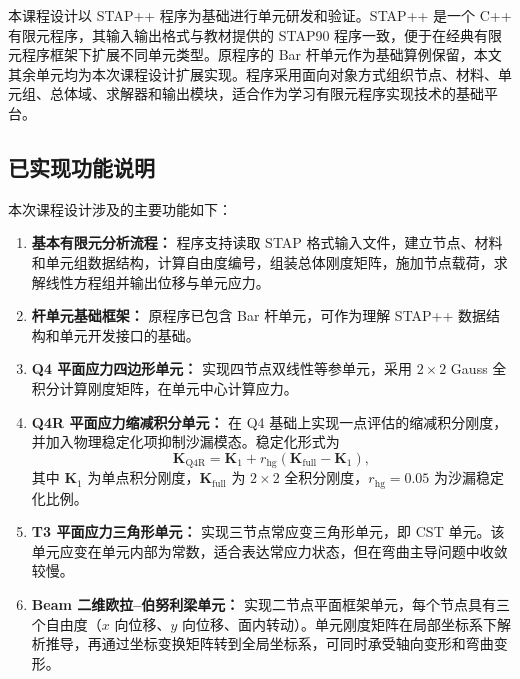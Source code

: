 \documentclass[UTF8,a4paper,zihao=-4]{ctexart}
\newcommand{\Kmat}{\bm{K}}
\begin{document}
本课程设计以 STAP++ 程序为基础进行单元研发和验证。STAP++ 是一个 C++ 有限元程序，其输入输出格式与教材提供的 STAP90 程序一致，便于在经典有限元程序框架下扩展不同单元类型。原程序的 Bar 杆单元作为基础算例保留，本文其余单元均为本次课程设计扩展实现。程序采用面向对象方式组织节点、材料、单元组、总体域、求解器和输出模块，适合作为学习有限元程序实现技术的基础平台。

\subsection{已实现功能说明}

本次课程设计涉及的主要功能如下：

\begin{enumerate}
    \item \textbf{基本有限元分析流程：}
    程序支持读取 STAP 格式输入文件，建立节点、材料和单元组数据结构，计算自由度编号，组装总体刚度矩阵，施加节点载荷，求解线性方程组并输出位移与单元应力。

    \item \textbf{杆单元基础框架：}
    原程序已包含 Bar 杆单元，可作为理解 STAP++ 数据结构和单元开发接口的基础。

    \item \textbf{Q4 平面应力四边形单元：}
    实现四节点双线性等参单元，采用 $2\times2$ Gauss 全积分计算刚度矩阵，在单元中心计算应力。

    \item \textbf{Q4R 平面应力缩减积分单元：}
    在 Q4 基础上实现一点评估的缩减积分刚度，并加入物理稳定化项抑制沙漏模态。稳定化形式为
    \begin{equation}
        \Kmat_{\mathrm{Q4R}}
        =
        \Kmat_{1}
        +
        r_{\mathrm{hg}}
        \left(
            \Kmat_{\mathrm{full}}-\Kmat_{1}
        \right),
    \end{equation}
    其中 $\Kmat_{1}$ 为单点积分刚度，$\Kmat_{\mathrm{full}}$ 为 $2\times2$ 全积分刚度，$r_{\mathrm{hg}}=0.05$ 为沙漏稳定化比例。

    \item \textbf{T3 平面应力三角形单元：}
    实现三节点常应变三角形单元，即 CST 单元。该单元应变在单元内部为常数，适合表达常应力状态，但在弯曲主导问题中收敛较慢。

    \item \textbf{Beam 二维欧拉--伯努利梁单元：}
    实现二节点平面框架单元，每个节点具有三个自由度（$x$ 向位移、$y$ 向位移、面内转动）。单元刚度矩阵在局部坐标系下解析推导，再通过坐标变换矩阵转到全局坐标系，可同时承受轴向变形和弯曲变形。


\end{enumerate}
\end{document}
